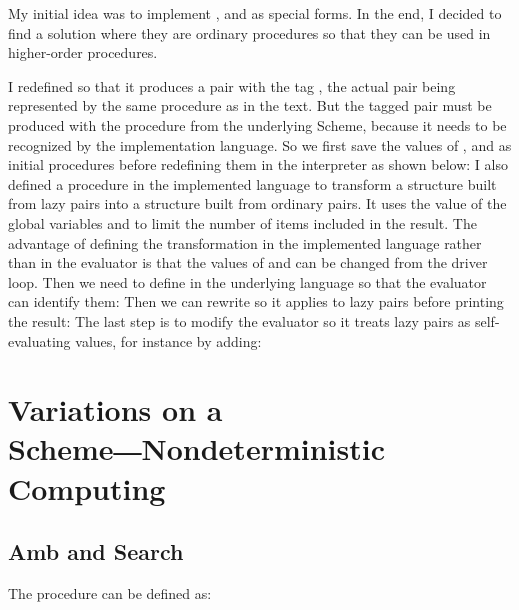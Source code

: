 \begin{exe}[4.34]
    My initial idea was to implement ,  and  as 
    special forms. In the end, I decided to find a solution where they are 
    ordinary procedures so that they can be used in higher-order procedures.

    I redefined  so that it produces a pair with the tag 
    , the actual pair being represented by the same procedure as 
    in the text. But the tagged pair must be produced with the  
    procedure from the underlying Scheme, because it needs to be recognized by 
    the implementation language. So we first save the values of , 
     and  as initial procedures before redefining them in 
    the interpreter as shown below:
    I also defined a  procedure in the implemented 
    language to transform a structure built from lazy pairs into a structure 
    built from ordinary pairs. It uses the value of the global variables 
     and  to limit the number of items 
    included in the result. The advantage of defining the transformation in the 
    implemented language rather than in the evaluator is that the values of 
     and  can be changed from the driver 
    loop.
    Then we need to define  in the underlying language so that
    the evaluator can identify them:
    Then we can rewrite  so it applies 
     to lazy pairs before printing the result:
    The last step is to modify the evaluator so it treats lazy pairs as 
    self-evaluating values, for instance by adding:
\end{exe}

\section{Variations on a Scheme―Nondeterministic Computing}

\subsection{Amb and Search}

\begin{exe}[4.35]
    \label{4.35}
    The procedure  can be defined as:
\end{exe}

